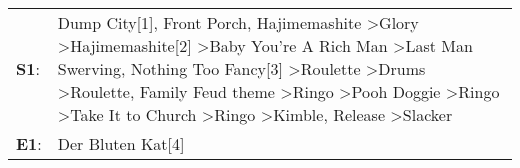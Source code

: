 \begin{supertabular}{p{0.03\textwidth}p{0.92\textwidth}}
 \textbf{S1}:  &  Dump City[1]\textsuperscript{}, \enspace Front Porch\textsuperscript{}, \enspace Hajimemashite\textsuperscript{} \textgreater \enspace Glory\textsuperscript{} \textgreater \enspace Hajimemashite[2]\textsuperscript{} \textgreater \enspace Baby You're A Rich Man\textsuperscript{} \textgreater \enspace Last Man Swerving\textsuperscript{}, \enspace Nothing Too Fancy[3]\textsuperscript{} \textgreater \enspace Roulette\textsuperscript{} \textgreater \enspace Drums\textsuperscript{} \textgreater \enspace Roulette\textsuperscript{}, \enspace Family Feud theme\textsuperscript{} \textgreater \enspace Ringo\textsuperscript{} \textgreater \enspace Pooh Doggie\textsuperscript{} \textgreater \enspace Ringo\textsuperscript{} \textgreater \enspace Take It to Church\textsuperscript{} \textgreater \enspace Ringo\textsuperscript{} \textgreater \enspace Kimble\textsuperscript{}, \enspace Release\textsuperscript{} \textgreater \enspace Slacker\textsuperscript{}  \enspace  \\
 \textbf{E1}:  &                                                                                                                                                                                                                                                                                                                                                                                                                                                                                                                                                                                                                                                                                                                                                                                                                                                                                                                                                         Der Bluten Kat[4]\textsuperscript{}  \enspace  \\
\end{supertabular}
